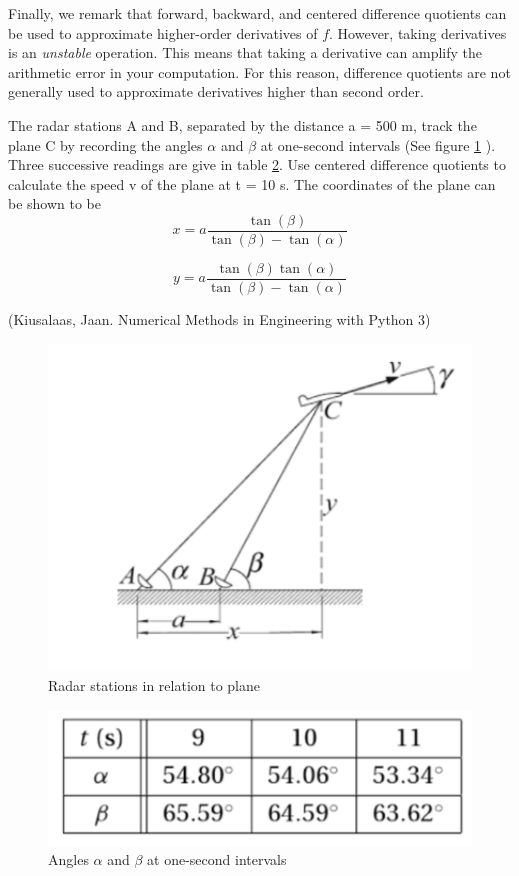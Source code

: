 Finally, we remark that forward, backward, and centered difference quotients can be used to approximate higher-order derivatives of $f$.
However, taking derivatives is an \emph{unstable} operation.
This means that taking a derivative can amplify the arithmetic error in your computation.
For this reason, difference quotients are not generally used  to approximate derivatives higher than second order.

\begin{problem}
The radar stations A and B, separated by the distance a = 500 m, track the plane C by recording the angles $\alpha$ and $\beta$ at one-second intervals (See figure \ref{plane} ).
Three successive readings are give in table \ref{angles}.
Use centered difference quotients to calculate the speed v of the plane at t = 10 s.
The coordinates of the plane can be shown to be
\begin{equation}
x = a \frac{\tan(\beta)}{\tan(\beta)-\tan(\alpha)}
\end{equation}

\begin{equation}
 y = a \frac{\tan(\beta)\tan(\alpha)}{\tan(\beta)-\tan(\alpha)}
\end{equation}


(Kiusalaas, Jaan. Numerical Methods in Engineering with Python 3)
\end{problem}

\begin{figure}
\includegraphics[width=.5\textwidth]{figures/plane_diagram.pdf}
\caption{Radar stations in relation to plane}
\label{plane}
\end{figure}

\begin{figure}
\includegraphics[width=.5\textwidth]{figures/angles_table.pdf}
\caption{Angles $\alpha$ and $\beta$ at one-second intervals}
\label{angles}
\end{figure}

